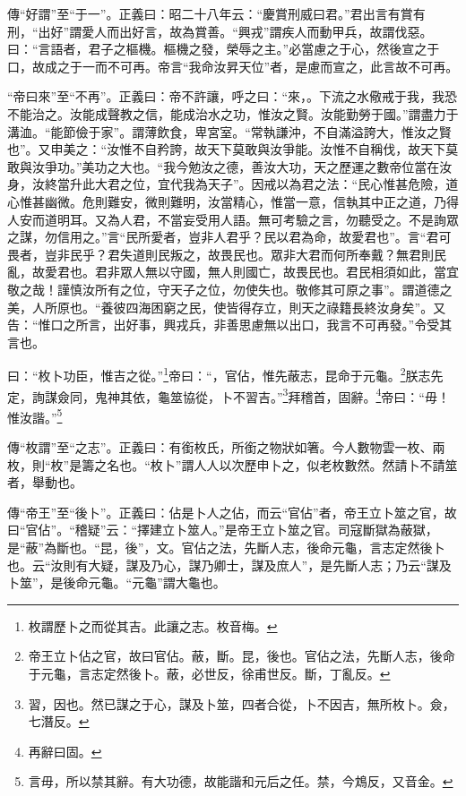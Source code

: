 {\noindent\zhuan{}\fzbyks 傳“好謂”至“于一”。正義曰：昭二十八年云：“慶賞刑威曰君。”君出言有賞有刑，“出好”謂愛人而出好言，故為賞善。“興戎”謂疾人而動甲兵，故謂伐惡。曰：“言語者，君子之樞機。樞機之發，榮辱之主。”必當慮之于心，然後宣之于口，故成之于一而不可再。帝言“我命汝昇天位”者，是慮而宣之，此言故不可再。 \par}

{\noindent\shu{}\fzkt “帝曰來”至“不再”。正義曰：帝不許讓，呼之曰：“來，。下流之水儆戒于我，我恐不能治之。汝能成聲教之信，能成治水之功，惟汝之賢。汝能勤勞于國。”謂盡力于溝洫。“能節儉于家”。謂薄飲食，卑宮室。“常執謙沖，不自滿溢誇大，惟汝之賢也”。又申美之：“汝惟不自矜誇，故天下莫敢與汝爭能。汝惟不自稱伐，故天下莫敢與汝爭功。”美功之大也。“我今勉汝之德，善汝大功，天之歷運之數帝位當在汝身，汝終當升此大君之位，宜代我為天子”。因戒以為君之法：“民心惟甚危險，道心惟甚幽微。危則難安，微則難明，汝當精心，惟當一意，信執其中正之道，乃得人安而道明耳。又為人君，不當妄受用人語。無可考驗之言，勿聽受之。不是詢眾之謀，勿信用之。”言“民所愛者，豈非人君乎？民以君為命，故愛君也”。言“君可畏者，豈非民乎？君失道則民叛之，故畏民也。眾非大君而何所奉戴？無君則民亂，故愛君也。君非眾人無以守國，無人則國亡，故畏民也。君民相須如此，當宜敬之哉！謹慎汝所有之位，守天子之位，勿使失也。敬修其可原之事”。謂道德之美，人所原也。“養彼四海困窮之民，使皆得存立，則天之祿籍長終汝身矣”。又告：“惟口之所言，出好事，興戎兵，非善思慮無以出口，我言不可再發。”令受其言也。 \par}

曰：“枚卜功臣，惟吉之從。”\footnote{枚謂歷卜之而從其吉。此讓之志。枚音梅。}帝曰：“，官佔，惟先蔽志，昆命于元龜。\footnote{帝王立卜佔之官，故曰官佔。蔽，斷。昆，後也。官佔之法，先斷人志，後命于元龜，言志定然後卜。蔽，必世反，徐甫世反。斷，丁亂反。}朕志先定，詢謀僉同，鬼神其依，龜筮協從，卜不習吉。”\footnote{習，因也。然已謀之于心，謀及卜筮，四者合從，卜不因吉，無所枚卜。僉，七潛反。}拜稽首，固辭。\footnote{再辭曰固。}帝曰：“毋！惟汝諧。”\footnote{言毋，所以禁其辭。有大功德，故能諧和元后之任。禁，今鴆反，又音金。}

{\noindent\zhuan{}\fzbyks 傳“枚謂”至“之志”。正義曰：有銜枚氏，所銜之物狀如箸。今人數物雲一枚、兩枚，則“枚”是籌之名也。“枚卜”謂人人以次歷申卜之，似老枚數然。然請卜不請筮者，舉動也。 \par}

{\noindent\zhuan{}\fzbyks 傳“帝王”至“後卜”。正義曰：佔是卜人之佔，而云“官佔”者，帝王立卜筮之官，故曰“官佔”。“稽疑”云：“擇建立卜筮人。”是帝王立卜筮之官。司寇斷獄為蔽獄，是“蔽”為斷也。“昆，後”，文。官佔之法，先斷人志，後命元龜，言志定然後卜也。云“汝則有大疑，謀及乃心，謀乃卿士，謀及庶人”，是先斷人志；乃云“謀及卜筮”，是後命元龜。“元龜”謂大龜也。 \par}

